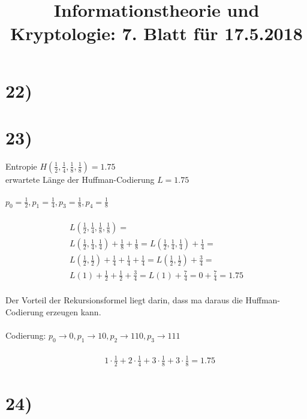 %



  \title{Informationstheorie und Kryptologie: 7. Blatt für 17.5.2018}
  \maketitle

  \section*{22)}

  

  \section*{23)}

  Entropie $H(\frac{1}{2}, \frac{1}{4}, \frac{1}{8}, \frac{1}{8}) = 1.75$\\
  erwartete Länge der Huffman-Codierung $L = 1.75$\\
  \\
  $p_0 = \frac{1}{2}, p_1 = \frac{1}{4}, p_3 = \frac{1}{8}, p_4 = \frac{1}{8}$\\
  \\
  \begin{align*}
    & L(\frac{1}{2}, \frac{1}{4}, \frac{1}{8}, \frac{1}{8}) = &\\
    & L(\frac{1}{2}, \frac{1}{4}, \frac{1}{4}) + \frac{1}{8} + \frac{1}{8} = L(\frac{1}{2}, \frac{1}{4}, \frac{1}{4}) + \frac{1}{4} =\\ 
    & L(\frac{1}{2}, \frac{1}{2}) + \frac{1}{4} + \frac{1}{4} + \frac{1}{4} = L(\frac{1}{2}, \frac{1}{2}) + \frac{3}{4} =\\
    & L(1) + \frac{1}{2} + \frac{1}{2} + \frac{3}{4} = L(1) + \frac{7}{4} = 0 + \frac{7}{4} = 1.75
  \end{align*}
  \\
  Der Vorteil der Rekursionsformel liegt darin, dass ma daraus die Huffman-Codierung erzeugen kann.\\
  \\
  Codierung: $p_0 \rightarrow 0, p_1 \rightarrow 10, p_2 \rightarrow 110, p_3 \rightarrow 111$\\
  \\
  \begin{align*}
    & 1 \cdot \frac{1}{2} + 2 \cdot \frac{1}{4} + 3 \cdot \frac{1}{8} + 3 \cdot \frac{1}{8} = 1.75
  \end{align*}

  \section*{24)}

